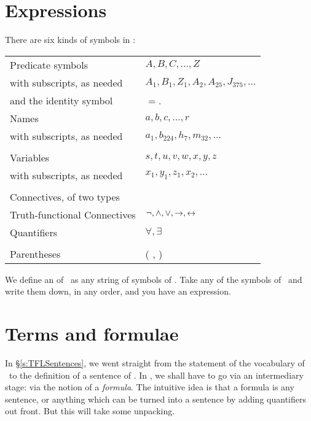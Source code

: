 \section{Expressions}
There are six kinds of symbols in \FOL:

\begin{center}
\begin{tabular}{l l} \toprule 
Predicate symbols & $A,B,C,…,Z$\\
with subscripts, as needed & $A_{1}, B_{1},Z_{1},A_{2},A_{25},J_{375},…$\\
and the identity symbol &  $=$.
\\
Names & $a,b,c,…, r$\\
with subscripts, as needed & $a_{1}, b_{224}, h_7, m_{32},…$\\
\\
Variables & $s, t, u, v, w, x,y,z$\\
with subscripts, as needed & $x_{1}, y_{1}, z_{1}, x_{2},…$\\
\\
Connectives, of two types & \\
Truth-functional Connectives & $\neg,\wedge,\vee,\rightarrow,\leftrightarrow$\\
Quantifiers & $\forall, \exists$\\
\\
Parentheses &( , )\\
\bottomrule \end{tabular}
\end{center}
We define an  of \FOL\ as any string of symbols of \FOL. Take any of the symbols of \FOL\ and write them down, in any order, and you have an expression.

\section{Terms and formulae}\label{s:termsandf}
In §\ref{s:TFLSentences}, we went straight from the statement of the vocabulary of \TFL\ to the definition of a sentence of \TFL. In \FOL, we shall have to go via an intermediary stage: via the notion of a  \emph{formula}. The intuitive idea is that a formula is any sentence, or anything which can be turned into a sentence by adding quantifiers out front. But this will take some unpacking.

